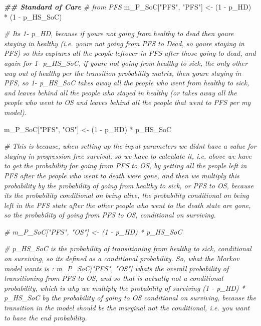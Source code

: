 \documentclass[
]{article}
\newenvironment{Shaded}{\begin{snugshade}}{\end{snugshade}}
\newcommand{\CommentTok}[1]{\textcolor[rgb]{0.56,0.35,0.01}{\textit{#1}}}
\newcommand{\DecValTok}[1]{\textcolor[rgb]{0.00,0.00,0.81}{#1}}
\newcommand{\DocumentationTok}[1]{\textcolor[rgb]{0.56,0.35,0.01}{\textbf{\textit{#1}}}}
\newcommand{\NormalTok}[1]{#1}
\newcommand{\OtherTok}[1]{\textcolor[rgb]{0.56,0.35,0.01}{#1}}
\newcommand{\SpecialCharTok}[1]{\textcolor[rgb]{0.00,0.00,0.00}{#1}}
\newcommand{\StringTok}[1]{\textcolor[rgb]{0.31,0.60,0.02}{#1}}
\begin{document}
\begin{Shaded}
\begin{Highlighting}[]
\DocumentationTok{\#\# Standard of Care}
\CommentTok{\# from PFS}
\NormalTok{m\_P\_SoC[}\StringTok{"PFS"}\NormalTok{, }\StringTok{"PFS"}\NormalTok{] }\OtherTok{\textless{}{-}}\NormalTok{ (}\DecValTok{1} \SpecialCharTok{{-}}\NormalTok{ p\_HD) }\SpecialCharTok{*}\NormalTok{ (}\DecValTok{1} \SpecialCharTok{{-}}\NormalTok{ p\_HS\_SoC)}

\CommentTok{\# It\textquotesingle{}s 1{-} p\_HD, because if you\textquotesingle{}re not going from healthy to dead then you\textquotesingle{}re staying in healthy (i.e. you\textquotesingle{}re not going from PFS to Dead, so you\textquotesingle{}re staying in PFS) so this captures all the people leftover in PFS after those going to dead, and again for 1{-} p\_HS\_SoC, if you\textquotesingle{}re not going from healthy to sick, the only other way out of healthy per the transition probability matrix, then you\textquotesingle{}re staying in PFS, so 1{-} p\_HS\_SoC takes away all the people who went from healthy to sick, and leaves behind all the people who stayed in healthy (or takes away all the people who went to OS and leaves behind all the people that went to PFS per my model).}

\NormalTok{m\_P\_SoC[}\StringTok{"PFS"}\NormalTok{, }\StringTok{"OS"}\NormalTok{]    }\OtherTok{\textless{}{-}}\NormalTok{ (}\DecValTok{1} \SpecialCharTok{{-}}\NormalTok{ p\_HD) }\SpecialCharTok{*}\NormalTok{      p\_HS\_SoC}

\CommentTok{\# This is because, when setting up the input parameters we didn\textquotesingle{}t have a value for staying in progression free survival, so we have to calculate it, i.e. above we have to get the probability for going from PFS to OS, by getting all the people left in PFS after the people who went to death were gone, and then we multiply this probability by the probability of going from healthy to sick, or PFS to OS, because it\textquotesingle{}s the probability conditional on being alive, the probability conditional on being left in the PFS state after the other people who went to the death state are gone, so the probability of going from PFS to OS, conditional on surviving.}



\CommentTok{\# m\_P\_SoC["PFS", "OS"]    \textless{}{-} (1 {-} p\_HD) *      p\_HS\_SoC}

\CommentTok{\# p\_HS\_SoC is the probability of transitioning from healthy to sick, conditional on surviving, so it\textquotesingle{}s defined as a conditional probability. So, what the Markov model wants is : m\_P\_SoC["PFS", "OS"] what\textquotesingle{}s the overall probability of transitioning from PFS to OS, and so that is actually not a conditional probability, which is why we multiply the probability of surviving (1 {-} p\_HD) *      p\_HS\_SoC by the probability of going to OS conditional on surviving, because the transition in the model should be the marginal not the conditional, i.e. you want to have the end probability.}






\end{Highlighting}
\end{Shaded}
\end{document}
